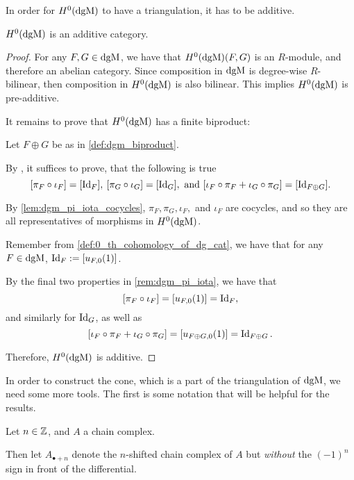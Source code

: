 In order for \( H^0(\operatorname{dgM}) \) to have a triangulation, it has to be additive.

\begin{lemma}
    \( H^0(\operatorname{dgM}) \) is an additive category.
\end{lemma}
\begin{proof}
    For any \( F, G \in \operatorname{dgM} \), we have that \( H^0(\operatorname{dgM})(F, G) \) is an \( R \)-module, and therefore an abelian category. Since composition in \( \operatorname{dgM} \) is degree-wise \( R \)-bilinear, then composition in \( H^0(\operatorname{dgM}) \) is also bilinear. This implies \( H^0(\operatorname{dgM}) \) is pre-additive.

    It remains to prove that \( H^0(\operatorname{dgM}) \) has a finite biproduct:

    Let \( F \oplus G \) be as in \autoref{def:dgm_biproduct}.
    
    By \cite[p.\ 250]{Mac_Lane_1995}, it suffices to prove, that the following is true
    \[
        [\pi_F \circ \iota_F] = [\operatorname{Id}_F], \: [\pi_G \circ \iota_G] = [\operatorname{Id}_G], \text{ and } [\iota_F \circ \pi_F + \iota_G \circ \pi_G] = [\operatorname{Id}_{F \oplus G}].
    \]

    By \autoref{lem:dgm_pi_iota_cocycles}, \( \pi_F, \pi_G, \iota_F, \) and \( \iota_F \) are cocycles, and so they are all representatives of morphisms in \( H^0(\operatorname{dgM}) \).

    Remember from \autoref{def:0_th_cohomology_of_dg_cat}, we have that for any \( F \in \operatorname{dgM} \), \( \operatorname{Id}_F := [u_{F, 0} ( 1 )] \).

    By the final two properties in \autoref{rem:dgm_pi_iota}, we have that
    \[
        [\pi_F \circ \iota_F] = [u_{F, 0} (1)] = \operatorname{Id}_F,
    \]
    and similarly for \( \operatorname{Id}_G \), as well as
    \[
        [\iota_F \circ \pi_F + \iota_G \circ \pi_G] = [u_{F \oplus G, 0} (1)] = \operatorname{Id}_{F \oplus G}.
    \]

    Therefore, \( H^0(\operatorname{dgM}) \) is additive.
\end{proof}

In order to construct the cone, which is a part of the triangulation of \( \operatorname{dgM} \), we need some more tools. The first is some notation that will be helpful for the results.

\begin{notation}
    Let \( n \in {\mathbb{Z}} \), and \( A \) a chain complex.
    
    Then let \( A_{\bullet+n} \) denote the \( n \)-shifted chain complex of \( A \) but \emph{without} the \( (-1)^n \) sign in front of the differential.
\end{notation}

